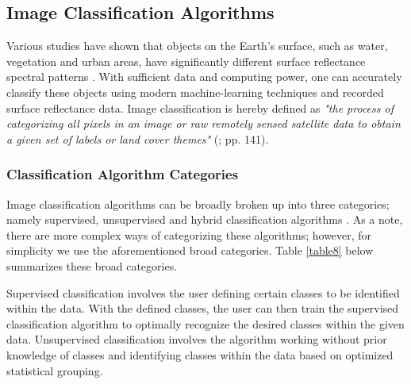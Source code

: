 \subsection{Image Classification Algorithms}\label{litrev}

\justify
Various studies have shown that objects on the Earth's surface, such as water, vegetation and urban areas, have significantly different surface reflectance spectral patterns \citep{lwin2008, SM2005}. With sufficient data and computing power, one can accurately classify these objects using modern machine-learning techniques and recorded surface reflectance data. Image classification is hereby defined as \textit{"the process of categorizing all pixels in an image or raw remotely sensed satellite data to obtain a given set of labels or land cover themes"} (\citealp{al2013image}; pp. 141). 

\subsubsection{Classification Algorithm Categories}

\justify
Image classification algorithms can be broadly broken up into three categories; namely supervised, unsupervised and hybrid classification algorithms \citep{al2013image}. As a note, there are more complex ways of categorizing these algorithms; however, for simplicity we use the aforementioned broad categories. Table \ref{table8} below summarizes these broad categories.

\justify
Supervised classification involves the user defining certain classes to be identified within the data. With the defined classes, the user can then train the supervised classification algorithm to optimally recognize the desired classes within the given data. Unsupervised classification involves the algorithm working without prior knowledge of classes and identifying classes within the data based on optimized statistical grouping. 

